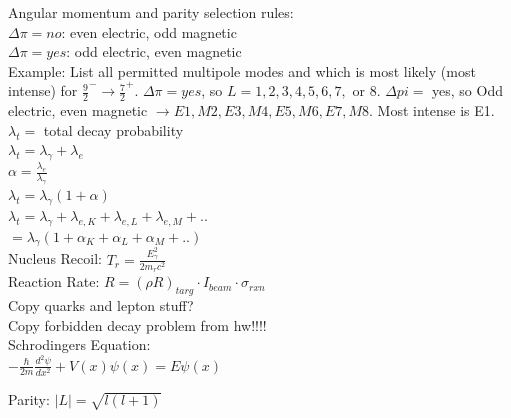\documentclass{article}
\begin{document}
\begin{multicols}{3}
Angular momentum and parity selection rules:\\
$\Delta \pi = no$: even electric, odd magnetic\\
$\Delta \pi = yes$: odd electric, even magnetic\\

Example: List all permitted multipole modes and which is most likely (most intense) for $\frac{9}{2}^{-} \rightarrow \frac{7}{2}^{+}$.  $\Delta \pi = yes$, so $L = 1,2,3,4,5,6,7,$ or $8$.  $\Delta pi = $ yes, so Odd electric, even magnetic $ \rightarrow E1, M2, E3, M4, E5, M6, E7, M8$.  Most intense is E1.\\
$\lambda_{t} =$ total decay probability\\
$\lambda_{t} = \lambda_{\gamma} + \lambda_{e}$\\
$\alpha = \frac{\lambda_{e}}{\lambda_{\gamma}}$\\
$\lambda_{t} = \lambda_{\gamma}(1+\alpha)$\\
$\lambda_{t} = \lambda_{\gamma} + \lambda_{e,K} + \lambda_{e,L} + \lambda_{e,M} + ..$\\$ = \lambda_{\gamma}(1 + \alpha_{K} + \alpha_{L} + \alpha_{M} + ..)$\\
Nucleus Recoil: $T_{r} = \frac{E_{\gamma}^{2}}{2m_{r}c^{2}}$\\
Reaction Rate: $R = (\rho R)_{targ} \cdot I_{beam} \cdot \sigma_{rxn}$\\

Copy quarks and lepton stuff?\\
Copy forbidden decay problem from hw!!!!\\

Schrodingers Equation:\\
$-\frac{\hbar}{2m}\frac{d^{2}\psi}{dx^{2}} + V(x)\psi(x) = E\psi(x)$

Parity:  $|L| = \sqrt{l(l+1)}$

\end{multicols}
 
\end{document}
